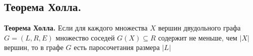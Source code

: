 \subsection{Теорема Холла.}


\textbf{Теорема Холла.} Если для каждого множества $X$ вершин двудольного графа $G = (L, R, E)$ множество соседей $G(X) \subseteq R$ содержит не меньше, чем $|X|$ вершин, то в графе $G$ есть паросочетания размера $|L|$